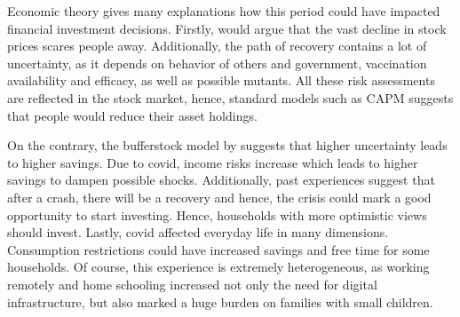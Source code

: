 \documentclass[ProjectABM]{subfiles}
\begin{document}


Economic theory gives many explanations how this period could have impacted financial investment decisions. Firstly, \cite{malmendier_2011} would argue that the vast decline in stock prices scares people away. Additionally, the path of recovery contains a lot of uncertainty, as it depends on behavior of others and government, vaccination availability and efficacy, as well as possible mutants. All these risk assessments are reflected in the stock market, hence, standard models such as CAPM suggests that people would reduce their asset holdings.

On the contrary, the bufferstock model by \cite{carroll2009bufferstock} suggests that higher uncertainty leads to higher savings. Due to covid, income risks increase which leads to higher savings to dampen possible shocks. %
Additionally, past experiences suggest that after a crash, there will be a recovery and hence, the crisis could mark a good opportunity to start investing. Hence, households with more optimistic views should invest. Lastly, covid affected everyday life in many dimensions. Consumption restrictions could have increased savings and free time for some households. Of course, this experience is extremely heterogeneous, as working remotely and home schooling increased not only the need for digital infrastructure, but also marked a huge burden on families with small children.


\end{document}
